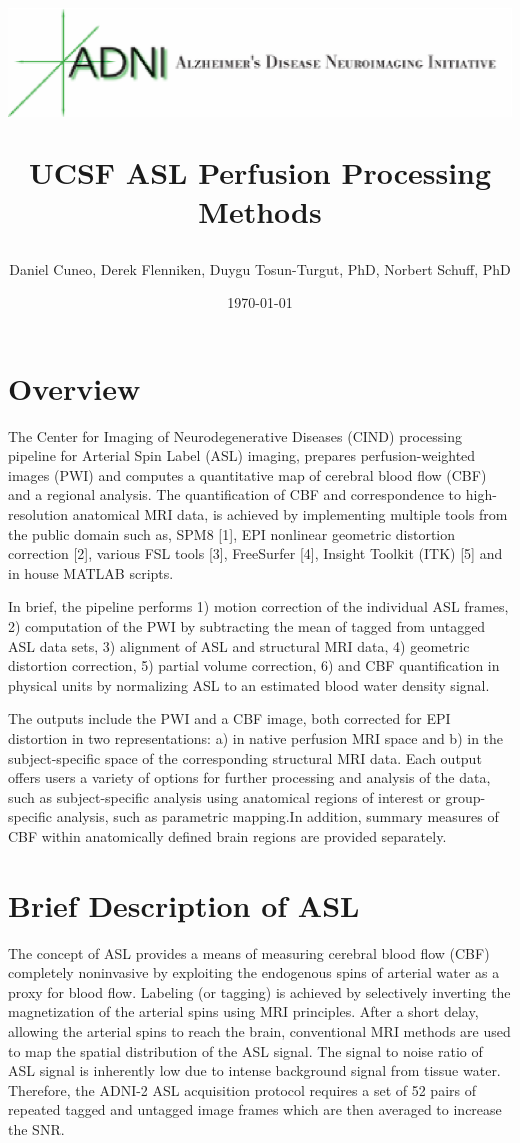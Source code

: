 \documentclass[letterpaper,11pt]{article}
\author{Daniel Cuneo, Derek Flenniken, Duygu Tosun-Turgut, PhD, Norbert Schuff, PhD}
\title{\begin{center}\includegraphics[scale = 1.0]{logo.eps}\end{center} \vspace*{4cm} UCSF ASL Perfusion Processing Methods}
\date{\today}
\begin{document}
\begin{titlepage}
\clearpage\maketitle\thispagestyle{empty}
\pagebreak

\tableofcontents
\thispagestyle{empty}
\pagebreak

\end{titlepage}

\section*{Overview}
The Center for Imaging of Neurodegenerative Diseases (CIND) processing pipeline for Arterial Spin Label (ASL) imaging, prepares perfusion-weighted images (PWI) and computes a quantitative map of cerebral blood flow (CBF) and a regional analysis. The quantification of CBF and correspondence to high-resolution anatomical MRI data, is achieved by implementing multiple tools from the public domain such as, SPM8 [1], EPI nonlinear geometric distortion correction [2], various FSL tools [3], FreeSurfer [4], Insight Toolkit (ITK) [5] and in house MATLAB scripts. 

In brief, the pipeline performs 1) motion correction of the individual ASL frames, 2) computation of the PWI  by subtracting the mean of tagged  from untagged  ASL data sets, 3) alignment of ASL and structural MRI data, 4) geometric distortion correction, 5) partial volume correction, 6) and CBF quantification in physical units by normalizing ASL to an estimated blood water density signal. 

The outputs include the PWI  and a CBF image, both corrected for EPI distortion in two representations: a) in native perfusion MRI space and b) in the subject-specific space of the corresponding structural MRI data. Each output offers users a variety of options for further processing and analysis of the data, such as subject-specific analysis using anatomical regions of interest or group-specific analysis, such as parametric mapping.In addition, summary measures of CBF within anatomically defined brain regions are provided separately.

\section*{Brief Description of ASL}
The concept of ASL provides a means of measuring cerebral blood flow (CBF) completely noninvasive by exploiting the endogenous spins of arterial water as a proxy for blood flow. Labeling (or tagging) is achieved by selectively inverting the magnetization of the arterial spins using MRI principles. After a short delay, allowing the arterial spins to reach the brain, conventional MRI methods are used to map the spatial distribution of the ASL signal. The signal to noise ratio of ASL signal is inherently low due to intense background signal from tissue water. Therefore, the ADNI-2 ASL acquisition protocol requires a set of 52 pairs of repeated tagged and untagged image frames which are then averaged to increase the SNR. 
\end{document}
